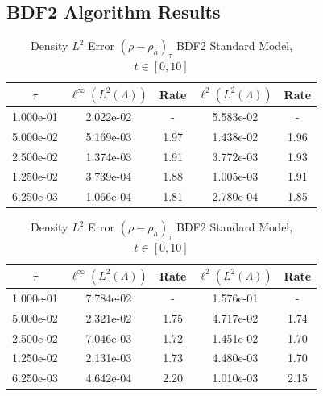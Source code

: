 \documentclass[letterpaper]{erdc}
\begin{document}
\subsection{BDF2 Algorithm Results}
\begin{table}[h!]
  \parbox{.45\linewidth}{
  \tiny
  \centering
    \caption{Density $L^2$ Error $(\rho - \rho_h)_{\tau}$ BDF2 Rotational Model, $t\in[0,10]$}
    \begin{tabular}{c|c|c|c|c}
      $\tau$  & $\ell^{\infty}\left(L^2(\Lambda)\right)$ &  Rate  &  $\ell^2\left(L^2(\Lambda)\right)$  &  Rate\\
      \hline
      1.000e-01 & 2.022e-02 &   -  & 5.583e-02 &   - \\
      5.000e-02 & 5.169e-03 & 1.97 & 1.438e-02 & 1.96\\
      2.500e-02 & 1.374e-03 & 1.91 & 3.772e-03 & 1.93\\
      1.250e-02 & 3.739e-04 & 1.88 & 1.005e-03 & 1.91\\
      6.250e-03 & 1.066e-04 & 1.81 & 2.780e-04 & 1.85
    \end{tabular}
    }
    \hfill
    \parbox{.45\linewidth}{
    \tiny
    \centering
      \caption{Density $L^2$ Error $(\rho - \rho_h)_{\tau}$ BDF2 Standard Model, $t\in[0,10]$}
      \begin{tabular}{c|c|c|c|c}
        $\tau$  & $\ell^{\infty}\left(L^2(\Lambda)\right)$ &  Rate  &  $\ell^2\left(L^2(\Lambda)\right)$  &  Rate\\
        \hline
        1.000e-01 & 7.784e-02 &   -  & 1.576e-01 &   - \\
        5.000e-02 & 2.321e-02 & 1.75 & 4.717e-02 & 1.74\\
        2.500e-02 & 7.046e-03 & 1.72 & 1.451e-02 & 1.70\\
        1.250e-02 & 2.131e-03 & 1.73 & 4.480e-03 & 1.70\\
        6.250e-03 & 4.642e-04 & 2.20 & 1.010e-03 & 2.15
      \end{tabular}
    }
\end{table}
\end{document}
